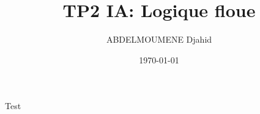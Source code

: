 \documentclass{article}
\title{TP2 IA: Logique floue}
\date{\today}
\author{ABDELMOUMENE Djahid}
\begin{document}
\maketitle

Test
\end{document}
